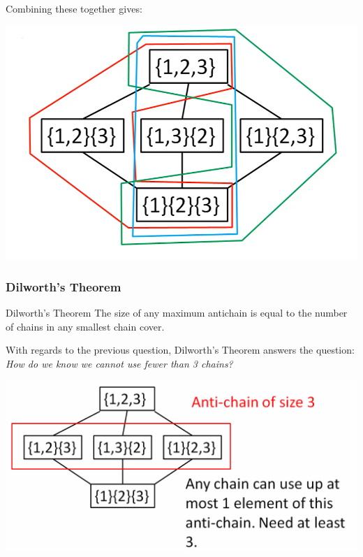 \documentclass[letterpaper]{article}
\begin{document}
\begin{itemize}
\begin{center}
    \end{center}
    Combining these together gives:
    \begin{center}
        \includegraphics[scale=0.5]{hasse_4.PNG}
    \end{center}
\end{itemize}

\subsubsection{Dilworth's Theorem}
\begin{theorem}{Dilworth's Theorem}{}
    The size of any maximum antichain is equal to the number of chains in any smallest chain cover. 
\end{theorem}

With regards to the previous question, Dilworth's Theorem answers the question: \emph{How do we know we cannot use fewer than 3 chains? }
\begin{center}
    \includegraphics[scale=0.25]{hasse_dil.PNG}
\end{center}
\end{document}
